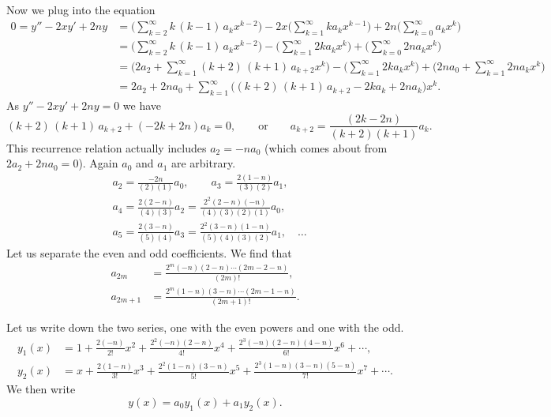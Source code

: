 \documentclass[12pt]{book}
\begin{document}
\begin{example}
Now we plug into the equation
\begin{equation*}
\begin{split}
0 = y''-2xy'+2ny &= 
\Biggl( \sum_{k=2}^\infty k\,(k-1) \, a_k x^{k-2}  \Biggr)
-
2x
\Biggl( \sum_{k=1}^\infty k a_k x^{k-1} \Biggr)
+
2n
\Biggl( \sum_{k=0}^\infty a_k x^k \Biggr)
\\
&=
\Biggl( \sum_{k=2}^\infty k\,(k-1) \, a_k x^{k-2}  \Biggr)
-
\Biggl( \sum_{k=1}^\infty 2k a_k x^k \Biggr)
+
\Biggl( \sum_{k=0}^\infty 2n a_k x^k \Biggr)
\\
&=
\Biggl(2a_2+
 \sum_{k=1}^\infty (k+2)\,(k+1) \, a_{k+2} x^k  \Biggr)
-
\Biggl( \sum_{k=1}^\infty 2k a_k x^k \Biggr)
+
\Biggl(
2na_0 + 
\sum_{k=1}^\infty 2n a_k x^k \Biggr)
\\
&=
2a_2+2na_0+
\sum_{k=1}^\infty \bigl( (k+2)\,(k+1) \, a_{k+2} - 2ka_k + 2n a_k \bigr) x^k .
\end{split}
\end{equation*}
As $y''-2xy'+2ny = 0$ we have
\begin{equation*}
(k+2)\,(k+1) \, a_{k+2} + ( - 2k+ 2n) a_k = 0 ,
\qquad
\text{or}
\qquad
a_{k+2} = \frac{(2k-2n)}{(k+2)(k+1)} a_k .
\end{equation*}
This recurrence relation actually includes
$a_2 = -na_0$ (which comes about from $2a_2+2na_0 = 0$).
Again $a_0$ and $a_1$ are arbitrary.
\begin{align*}
& a_2 = \frac{-2n}{(2)(1)}a_0, \qquad
a_3 = \frac{2(1-n)}{(3)(2)} a_1,
\\
& a_4 = \frac{2(2-n)}{(4)(3)} a_2 = \frac{2^2(2-n)(-n)}{(4)(3)(2)(1)} a_0 ,
\\
&
a_5 = \frac{2(3-n)}{(5)(4)} a_3 = \frac{2^2(3-n)(1-n)}{(5)(4)(3)(2)} a_1 ,
\quad \ldots
\end{align*}
Let us separate the even and odd coefficients.
We find that 
\begin{align*}
a_{2m} &=\frac{2^m(-n)(2-n)\cdots(2m-2-n)}{(2m)!} , \\
a_{2m+1} &=\frac{2^m(1-n)(3-n)\cdots(2m-1-n)}{(2m+1)!} .
\end{align*}

Let us write down the two series, one with the even powers and one with the
odd.
\begin{align*}
y_1(x) & = 
1+\frac{2(-n)}{2!} x^2 + \frac{2^2(-n)(2-n)}{4!} x^4 + 
\frac{2^3(-n)(2-n)(4-n)}{6!} x^6 + \cdots ,
\\
y_2(x) & = 
x+\frac{2(1-n)}{3!} x^3 + \frac{2^2(1-n)(3-n)}{5!} x^5 + 
\frac{2^3(1-n)(3-n)(5-n)}{7!} x^7 + \cdots .
\end{align*}
We then write
\begin{equation*}
y(x) = a_0 y_1(x) + a_1 y_2(x) .
\end{equation*}


\end{example}
\end{document}
